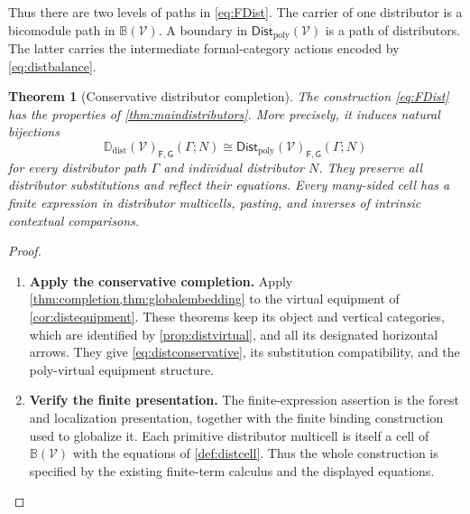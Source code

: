 \documentclass[11pt,reqno]{amsart}
\theoremstyle{plain}
\newtheorem{theorem}{Theorem}[section]
\theoremstyle{definition}
\theoremstyle{remark}
\numberwithin{equation}{section}
\newcommand{\V}{\mathcal V}
\newcommand{\Ddist}{\mathbb D_{\mathrm{dist}}}
\newcommand{\FDist}{\mathsf{Dist}_{\mathrm{poly}}}
\begin{document}
Thus there are two levels of paths in \cref{eq:FDist}. The carrier of
one distributor is a bicomodule path in $\mathbb B(\V)$. A boundary
in $\FDist(\V)$ is a path of distributors. The latter carries the
intermediate formal-category actions encoded by \cref{eq:distbalance}.

\begin{theorem}[Conservative distributor completion]\label{thm:distcompletion}
The construction \cref{eq:FDist} has the properties of
\cref{thm:maindistributors}. More precisely, it induces natural bijections
\begin{equation}\label{eq:distconservative}
 \Ddist(\V)_{\mathsf F,\mathsf G}(\Gamma;N)
 \cong\FDist(\V)_{\mathsf F,\mathsf G}(\Gamma;N)
\end{equation}
for every distributor path $\Gamma$ and individual distributor $N$.
They preserve all distributor substitutions and reflect their equations.
Every many-sided cell has a finite expression in distributor multicells,
pasting, and inverses of intrinsic contextual comparisons.
\end{theorem}
\begin{proof}\leavevmode
\begin{enumerate}
\item \textbf{Apply the conservative completion.} Apply \cref{thm:completion,thm:globalembedding} to the virtual equipment
of \cref{cor:distequipment}. These theorems keep its object and vertical
categories, which are identified by \cref{prop:distvirtual}, and all
its designated horizontal arrows. They give
\cref{eq:distconservative}, its substitution compatibility, and the
poly-virtual equipment structure.

\item \textbf{Verify the finite presentation.} The finite-expression assertion is the
forest and localization presentation, together with the finite binding
construction used to globalize it. Each primitive distributor multicell
is itself a cell of $\mathbb B(\V)$ with the equations of
\cref{def:distcell}. Thus the whole construction is specified by the
existing finite-term calculus and the displayed equations.\qedhere
\end{enumerate}
\end{proof}
\end{document}
